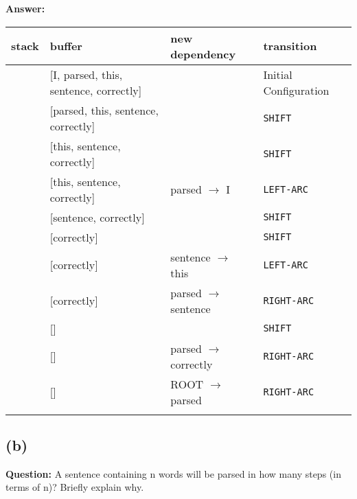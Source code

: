 \documentclass[11pt]{article}
\begin{document}
\textbf{Answer:}
\begin{table}[H]
  \centering
  \begin{tabular}{p{}|p{}|p{}|p{}}
    stack  & buffer & new dependency & transition\\
    \hline
    [ROOT]                         & [I, parsed, this, sentence, correctly] &                         & Initial Configuration \\\relax
    [ROOT, I]                      & [parsed, this, sentence, correctly]    &                         & \verb|SHIFT| \\              & [this, sentence, correctly]            &                         & \verb|SHIFT| \\                 & [this, sentence, correctly]            & parsed $\to$ I          & \verb|LEFT-ARC| \\           & [sentence, correctly]                  &                         & \verb|SHIFT| \\ & [correctly]                            &                         & \verb|SHIFT| \\       & [correctly]                            & sentence $\to$ this     & \verb|LEFT-ARC| \\                 & [correctly]                            & parsed $\to$ sentence   & \verb|RIGHT-ARC| \\      & []                                     &                         & \verb|SHIFT| \\                 & []                                     & parsed $\to$ correctly  & \verb|RIGHT-ARC| \\\relax
    [ROOT]                         & []                                     & ROOT $\to$ parsed       & \verb|RIGHT-ARC| \\\relax
  \end{tabular}
\end{table}

\subsection*{(b)}

\textbf{Question:} A sentence containing n words will be parsed in how many steps (in terms of n)? Briefly explain why.
\end{document}
